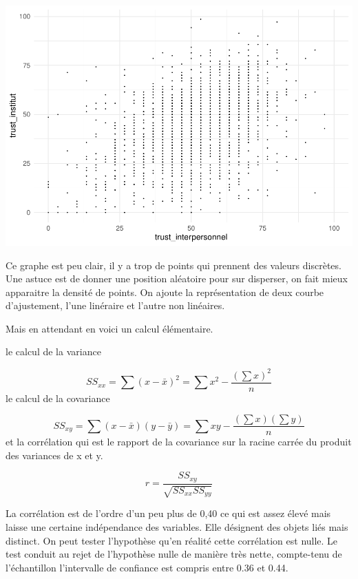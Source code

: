 \documentclass[
]{book}
\newenvironment{Shaded}{\begin{snugshade}}{\end{snugshade}}
\newcommand{\CommentTok}[1]{\textcolor[rgb]{0.56,0.35,0.01}{\textit{#1}}}
\newcommand{\KeywordTok}[1]{\textcolor[rgb]{0.13,0.29,0.53}{\textbf{#1}}}
\newcommand{\NormalTok}[1]{#1}
\newcommand{\OperatorTok}[1]{\textcolor[rgb]{0.81,0.36,0.00}{\textbf{#1}}}
\begin{document}
\includegraphics{bookdown-demo_files/figure-latex/412-1.pdf}

Ce graphe est peu clair, il y a trop de points qui prennent des valeurs discrètes. Une astuce est de donner une position aléatoire pour sur disperser, on fait mieux apparaitre la densité de points. On ajoute la représentation de deux courbe d'ajustement, l'une linéraire et l'autre non linéaires.

Mais en attendant en voici un calcul élémentaire.

le calcul de la variance

\[{SS}_{xx} = \sum (x - \bar{x})^2 = \sum x^2 - \frac {(\sum x)^2}{n}\]
le calcul de la covariance

\[{SS}_{xy} = \sum (x - \bar{x})(y - \bar{y}) = \sum xy - \frac {(\sum x)(\sum y)}{n}\]
et la corrélation qui est le rapport de la covariance sur la racine carrée du produit des variances de x et y.

\[r = \frac {{SS}_{xy}}{\sqrt {{SS}_{xx}{SS}_{yy}}}\]

La corrélation est de l'ordre d'un peu plus de 0,40 ce qui est assez élevé mais laisse une certaine indépendance des variables. Elle désignent des objets liés mais distinct. On peut tester l'hypothèse qu'en réalité cette corrélation est nulle. Le test conduit au rejet de l'hypothèse nulle de manière très nette, compte-tenu de l'échantillon l'intervalle de confiance est compris entre 0.36 et 0.44.

\begin{Shaded}
\end{Shaded}
\end{document}
